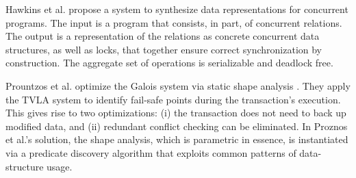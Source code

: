 Hawkins et al. \cite{HawkinsAFRS12} propose a system to synthesize data representations for concurrent programs. The input is a program that consists, in part, of concurrent relations. The output is a representation of the relations as concrete concurrent data structures, as well as locks, that together ensure correct synchronization by construction. The aggregate set of operations is serializable and deadlock free.

Prountzos et al. \cite{PrountzosMPM11} optimize the Galois system \cite{Galois} via static shape analysis \cite{MoolyToplas}. They apply the TVLA system to identify fail-safe points during the transaction's execution. This gives rise to two optimizations: (i) the transaction does not need to back up modified data, and (ii) redundant conflict checking can be eliminated. In Proznos et al.'s solution, the shape analysis, which is parametric in essence, is instantiated via a predicate discovery algorithm that exploits common patterns of data-structure usage.



